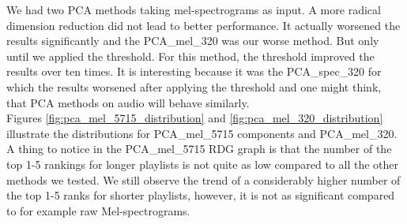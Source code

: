 We had two PCA methods taking mel-spectrograms as input. A more radical dimension reduction did not lead to better performance. It actually worsened the results significantly and the PCA\_mel\_320 was our worse method. But only until we applied the threshold. For this method, the threshold improved the results over ten times. It is interesting because it was the PCA\_spec\_320 for which the results worsened after applying the threshold and one might think, that PCA methods on audio will behave similarly.\\
Figures \ref{fig:pca_mel_5715_distribution} and \ref{fig:pca_mel_320_distribution} illustrate the distributions for PCA\_mel\_5715 components and PCA\_mel\_320. A thing to notice in the PCA\_mel\_{5715} RDG graph is that the number of the top 1-5 rankings for longer playlists is not quite as low compared to all the other methods we tested. We still observe the trend of a considerably higher number of the top 1-5 ranks for shorter playlists, however, it is not as significant compared to for example raw Mel-spectrograms.
